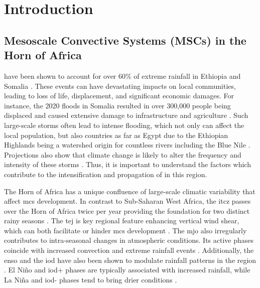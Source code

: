 \chapter{Introduction}
\label{ch:intro}

\section{Mesoscale Convective Systems (MSCs) in the Horn of Africa}

 have been shown to account for over 60\% of extreme rainfall in Ethiopia and Somalia \citep{Hill2023}. These events can have devastating impacts on local communities, leading to loss of life, displacement, and significant economic damages. For instance, the 2020 floods in Somalia resulted in over 300,000 people being displaced and caused extensive damage to infrastructure and agriculture . Such large-scale storms often lead to intense flooding, which not only can affect the local population, but also countries as far as Egypt due to the Ethiopian Highlands being a watershed origin for countless rivers including the Blue Nile \citep{Legese2020,Zaroug2014}. Projections also show that climate change is likely to alter the frequency and intensity of these storms \citep{Endris2019,Das2016}. Thus, it is important to understand the factors which contribute to the intensification and propagation of  in this region.

The Horn of Africa has a unique confluence of large-scale climatic variability that affect \acrshort{mcs} development. In contrast to Sub-Saharan West Africa, the \acrfull{itcz} passes over the Horn of Africa twice per year providing the foundation for two distinct rainy seasons \citep{Palmer2023,Tefera2025}. The \acrfull{tej} is key regional feature enhancing vertical wind shear, which can both facilitate or hinder \acrshort{mcs} development \citep{Farnsworth2011,Vashisht2021}. The \acrfull{mjo} also irregularly contributes to intra-seasonal changes in atmospheric conditions. Its active phases coincide with increased convection and extreme rainfall events \citep{Camberlin2019,Ochieng2023,Pohl2006}. Additionally, the \acrfull{enso} and the \acrfull{iod} have also been shown to modulate rainfall patterns in the region \citep{Dubache2019,Endris2019,Vashisht2021,Zaroug2014}. El Niño and \acrshort{iod}+ phases are typically associated with increased rainfall, while La Niña and \acrshort{iod}- phases tend to bring drier conditions \citep{Camberlin2019,Endris2019}.

